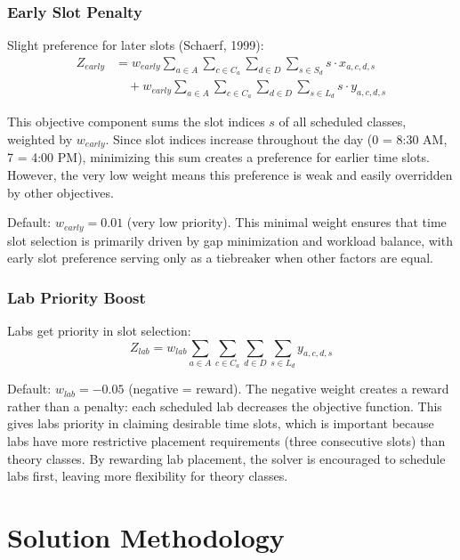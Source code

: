 \documentclass[12pt,a4paper]{article}
\begin{document}
\subsubsection{Early Slot Penalty}

Slight preference for later slots (Schaerf, 1999):
\begin{align}
Z_{early} &= w_{early} \sum_{a \in A} \sum_{c \in C_a} \sum_{d \in D} \sum_{s \in S_d} s \cdot x_{a,c,d,s} \\
&\quad + w_{early} \sum_{a \in A} \sum_{c \in C_a} \sum_{d \in D} \sum_{s \in L_d} s \cdot y_{a,c,d,s}
\end{align}

This objective component sums the slot indices $s$ of all scheduled classes, weighted by $w_{early}$. Since slot indices increase throughout the day (0 = 8:30 AM, 7 = 4:00 PM), minimizing this sum creates a preference for earlier time slots. However, the very low weight means this preference is weak and easily overridden by other objectives.

Default: $w_{early} = 0.01$ (very low priority). This minimal weight ensures that time slot selection is primarily driven by gap minimization and workload balance, with early slot preference serving only as a tiebreaker when other factors are equal.

\subsubsection{Lab Priority Boost}

Labs get priority in slot selection:
\begin{equation}
Z_{lab} = w_{lab} \sum_{a \in A} \sum_{c \in C_a} \sum_{d \in D} \sum_{s \in L_d} y_{a,c,d,s}
\end{equation}

Default: $w_{lab} = -0.05$ (negative = reward). The negative weight creates a reward rather than a penalty: each scheduled lab decreases the objective function. This gives labs priority in claiming desirable time slots, which is important because labs have more restrictive placement requirements (three consecutive slots) than theory classes. By rewarding lab placement, the solver is encouraged to schedule labs first, leaving more flexibility for theory classes.

\section{Solution Methodology}
\end{document}
